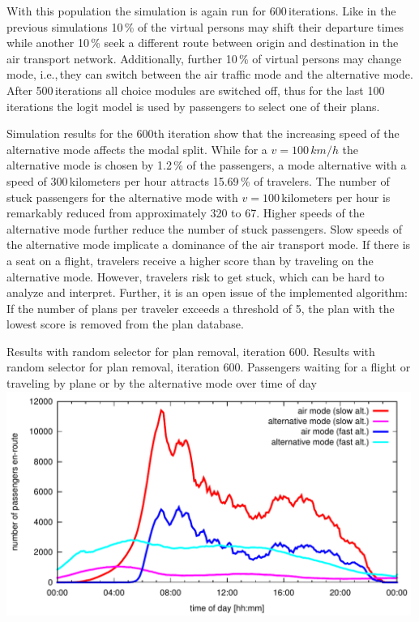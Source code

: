 With this population the simulation is again run for 600\,iterations. 
Like in the previous simulations 10\,\% of the virtual persons may shift their departure times while another 10\,\% seek a different route between origin and destination in the air transport network. 
Additionally, further 10\,\% of virtual persons may change mode, i.e.,\,they can switch between the air traffic mode and the alternative mode. 
After 500\,iterations all choice modules are switched off, thus for the last 100\,iterations the logit model is used by passengers to select one of their plans. 

Simulation results for the 600th iteration show that the increasing speed of the alternative mode affects the modal split.  
While for a $v = 100 \, km/h$ the alternative mode is chosen by 1.2\,\% of the passengers, a mode alternative with a speed of 300\,kilometers per hour attracts 15.69\,\% of travelers. 
The number of stuck passengers for the alternative mode with $v = 100$\,kilometers per hour is remarkably reduced from approximately 320 to 67. 
Higher speeds of the alternative mode further reduce the number of stuck passengers. 
Slow speeds of the alternative mode implicate a dominance of the air transport mode. 
If there is a seat on a flight, travelers receive a higher score than by traveling on the alternative mode. 
However, travelers risk to get stuck, which can be hard to analyze and interpret. 
Further, it is an open issue of the implemented algorithm: If the number of plans per traveler exceeds a threshold of 5, the plan with the lowest score is removed from the plan database. 

\createfigure%
{Results with random selector for plan removal, iteration 600.}%
{Results with random selector for plan removal, iteration 600. Passengers waiting for a flight or traveling by plane or by the alternative mode over time of day}%
{\label{fig:2009_leg_histogram_modes_psl}}%
{\includegraphics[width=0.99\textwidth, angle=0]{./extending/figures/air/leg_histogram_improved_flight_train_en_route_1893_1897_it_600.pdf}}%
{\citet{Grether2014PhD}}

